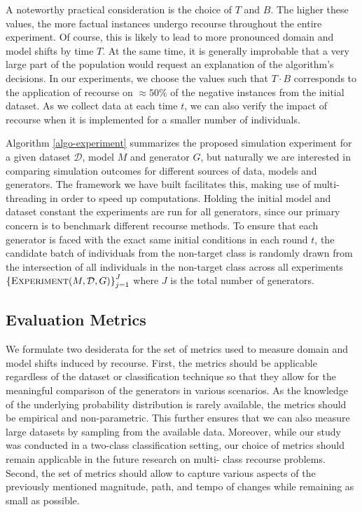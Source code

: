 \documentclass[
  conference]{IEEEtran}
\begin{document}
A noteworthy practical consideration is the choice of \(T\) and \(B\).
The higher these values, the more factual instances undergo recourse
throughout the entire experiment. Of course, this is likely to lead to
more pronounced domain and model shifts by time \(T\). At the same time,
it is generally improbable that a very large part of the population
would request an explanation of the algorithm's decisions. In our
experiments, we choose the values such that \(T \cdot B\) corresponds to
the application of recourse on \(\approx50\%\) of the negative instances
from the initial dataset. As we collect data at each time \(t\), we can
also verify the impact of recourse when it is implemented for a smaller
number of individuals.

Algorithm \ref{algo-experiment} summarizes the proposed simulation
experiment for a given dataset \(\mathcal{D}\), model \(M\) and
generator \(G\), but naturally we are interested in comparing simulation
outcomes for different sources of data, models and generators. The
framework we have built facilitates this, making use of multi-threading
in order to speed up computations. Holding the initial model and dataset
constant the experiments are run for all generators, since our primary
concern is to benchmark different recourse methods. To ensure that each
generator is faced with the exact same initial conditions in each round
\(t\), the candidate batch of individuals from the non-target class is
randomly drawn from the intersection of all individuals in the
non-target class across all experiments
\(\left\{\textsc{Experiment}(M,\mathcal{D},G)\right\}_{j=1}^J\) where
\(J\) is the total number of generators.

\hypertarget{sec-method-2-metrics}{%
\subsection{Evaluation Metrics}\label{sec-method-2-metrics}}

We formulate two desiderata for the set of metrics used to measure
domain and model shifts induced by recourse. First, the metrics should
be applicable regardless of the dataset or classification technique so
that they allow for the meaningful comparison of the generators in
various scenarios. As the knowledge of the underlying probability
distribution is rarely available, the metrics should be empirical and
non-parametric. This further ensures that we can also measure large
datasets by sampling from the available data. Moreover, while our study
was conducted in a two-class classification setting, our choice of
metrics should remain applicable in the future research on multi- class
recourse problems. Second, the set of metrics should allow to capture
various aspects of the previously mentioned magnitude, path, and tempo
of changes while remaining as small as possible.
\end{document}
